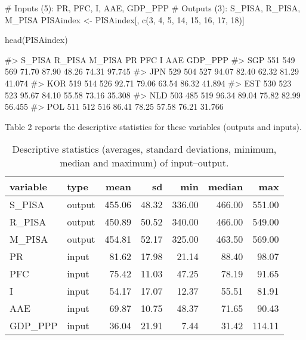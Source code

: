 \begin{Schunk}
\begin{Sinput}
# Inputs (5): PR, PFC, I, AAE, GDP_PPP
# Outputs (3): S_PISA, R_PISA, M_PISA
PISAindex <- PISAindex[, c(3, 4, 5, 14, 15, 16, 17, 18)]

head(PISAindex)
\end{Sinput}
\begin{Soutput}
#>     S_PISA R_PISA M_PISA    PR   PFC     I   AAE GDP_PPP
#> SGP    551    549    569 71.70 87.90 48.26 74.31  97.745
#> JPN    529    504    527 94.07 82.40 62.32 81.29  41.074
#> KOR    519    514    526 92.71 79.06 63.54 86.32  41.894
#> EST    530    523    523 95.67 84.10 55.58 73.16  35.308
#> NLD    503    485    519 96.34 89.04 75.82 82.99  56.455
#> POL    511    512    516 86.41 78.25 57.58 76.21  31.766
\end{Soutput}
\end{Schunk}

Table 2 reports the descriptive statistics for these variables (outputs
and inputs).

\begin{Schunk}
\begin{table}

\caption{\label{tab:descr-lat}Descriptive statistics (averages, standard deviations, minimum, median and maximum) of input–output.}
\centering
\fontsize{7}{9}\selectfont
\begin{tabular}[t]{l|l|r|r|r|r|r}
\hline
variable & type & mean & sd & min & median & max\\
\hline
S\_PISA & output & 455.06 & 48.32 & 336.00 & 466.00 & 551.00\\
\hline
R\_PISA & output & 450.89 & 50.52 & 340.00 & 466.00 & 549.00\\
\hline
M\_PISA & output & 454.81 & 52.17 & 325.00 & 463.50 & 569.00\\
\hline
PR & input & 81.62 & 17.98 & 21.14 & 88.40 & 98.07\\
\hline
PFC & input & 75.42 & 11.03 & 47.25 & 78.19 & 91.65\\
\hline
I & input & 54.17 & 17.07 & 12.37 & 55.51 & 81.91\\
\hline
AAE & input & 69.87 & 10.75 & 48.37 & 71.65 & 90.43\\
\hline
GDP\_PPP & input & 36.04 & 21.91 & 7.44 & 31.42 & 114.11\\
\hline
\end{tabular}
\end{table}

\end{Schunk}

